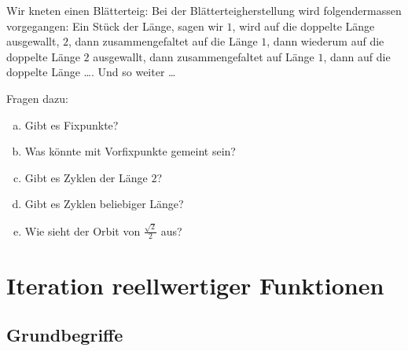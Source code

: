 \documentclass[%
11pt,%
twoside,%
titlepage,%
german,%
headsepline%
]{scrartcl}
\begin{document}
Wir kneten einen Blätterteig: Bei der Blätterteigherstellung wird folgendermassen vorgegangen: Ein Stück der Länge, sagen wir $1$, wird auf die doppelte Länge ausgewallt, $2$, dann zusammengefaltet auf die Länge $1$, dann wiederum auf die doppelte Länge $2$ ausgewallt, dann zusammengefaltet auf Länge $1$, dann auf die doppelte Länge \dots . Und so weiter \dots

Fragen dazu:

\begin{enumerate}[a)]
    \item Gibt es Fixpunkte?
    \item Was könnte mit Vorfixpunkte gemeint sein?
    \item Gibt es Zyklen der Länge $2$?
    \item Gibt es Zyklen beliebiger Länge?
    \item Wie sieht der Orbit von $\frac{\sqrt{2}}{2}$ aus?
\end{enumerate}

\clearpage

\section{Iteration reellwertiger Funktionen}

\subsection{Grundbegriffe}
\end{document}
